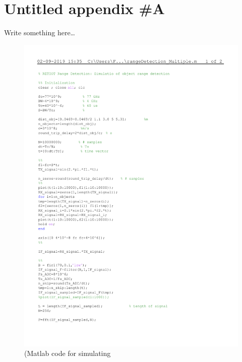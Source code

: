 \chapter{Untitled appendix \#A}
Write something here\ldots
\begin{figure}[ht] 
\centerline{\includegraphics [width=1.0 \textwidth]{imgs/appendix1/cr.pdf}}
\caption{(Matlab code for simulating }
\label{fig:dalg}
\end{figure}